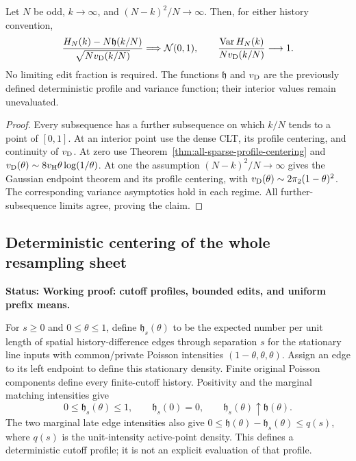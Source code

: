 \documentclass[11pt,letterpaper]{article}
\newcommand{\status}[1]{\textbf{Status: #1.}}
\begin{document}
\begin{corollary}
\label{cor:all-growing-profile-CLT}
Let $N$ be odd, $k\to\infty$, and
$(N-k)^2/N\to\infty$. Then, for either history convention,
\[
 \frac{H_N(k)-N\mathfrak h(k/N)}
                    {\sqrt{N v_{\rm D}(k/N)}}
                          \Longrightarrow\mathcal N(0,1),
 \qquad
 \frac{\operatorname{Var}H_N(k)}
                         {N v_{\rm D}(k/N)}\longrightarrow1.
\]
No limiting edit fraction is required.
The functions $\mathfrak h$ and $v_{\rm D}$ are the
previously defined deterministic profile and variance
function; their interior values remain unevaluated.
\end{corollary}
\begin{proof}
Every subsequence has a further subsequence on which
$k/N$ tends to a point of $[0,1]$.
At an interior point use the dense CLT, its profile
centering, and continuity of $v_{\rm D}$.
At zero use Theorem~\ref{thm:all-sparse-profile-centering}
and $v_{\rm D}(\theta)\sim8v_{\rm H}\theta\log(1/\theta)$.
At one the assumption $(N-k)^2/N\to\infty$ gives the
Gaussian endpoint theorem and its profile centering, with
$v_{\rm D}(\theta)\sim2\pi_2(1-\theta)^2$.
The corresponding variance asymptotics hold in each regime.
All further-subsequence limits agree, proving the claim.
\end{proof}

\subsection{Deterministic centering of the whole resampling sheet}
\label{sec:profile-centered-history-sheet}

\status{Working proof: cutoff profiles, bounded edits, and uniform prefix means}

For $s\ge0$ and $0\le\theta\le1$, define
$\mathfrak h_s(\theta)$ to be the expected number per unit
length of spatial history-difference edges through separation
$s$ for the stationary line inputs with common/private
Poisson intensities $(1-\theta,\theta,\theta)$.
Assign an edge to its left endpoint to define this stationary
density. Finite original Poisson components define every
finite-cutoff history. Positivity and the marginal matching
intensities give
\begin{equation}\label{eq:cutoff-profile-basic}
 0\le\mathfrak h_s(\theta)\le1,\qquad
 \mathfrak h_s(0)=0,\qquad
 \mathfrak h_s(\theta)\uparrow\mathfrak h(\theta).
\end{equation}
The two marginal late edge intensities also give
$0\le\mathfrak h(\theta)-\mathfrak h_s(\theta)\le q(s)$,
where $q(s)$ is the unit-intensity active-point density.
This defines a deterministic cutoff profile; it is not
an explicit evaluation of that profile.
\end{document}
